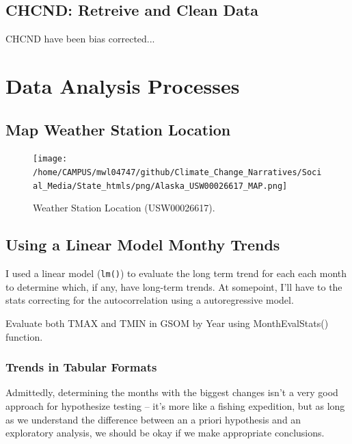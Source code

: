 \documentclass{article}\usepackage[]{graphicx}\usepackage[]{color}
\begin{document}
\subsection{CHCND: Retreive and Clean Data}

CHCND have been bias corrected...


\section{Data Analysis Processes}

\subsection{Map Weather Station Location}






\begin{figure}
\texttt{[image: /home/CAMPUS/mwl04747/github/Climate\_Change\_Narratives/Social\_Media/State\_htmls/png/Alaska\_USW00026617\_MAP.png]}
\caption{Weather Station Location (USW00026617). }
\label{fig:Map}
\end{figure}

\subsection{Using a Linear Model Monthy Trends}

I used a linear model (\texttt{lm()}) to evaluate the long term trend for each each month to determine which, if any, have long-term trends. At somepoint, I'll have to the stats correcting for the autocorrelation using a autoregressive model.  



Evaluate both TMAX and TMIN in GSOM by Year using MonthEvalStats() function. 




\subsubsection{Trends in Tabular Formats}

Admittedly, determining the months with the biggest changes isn't a very good approach for hypothesize testing -- it's more like a fishing expedition, but as long as we understand the difference between an a priori hypothesis and an exploratory analysis, we should be okay if we make appropriate conclusions. 
\end{document}
